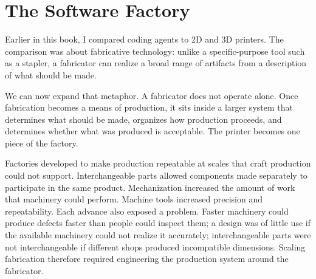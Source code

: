 


\chapter{The Software Factory}



Earlier in this book, I compared coding agents to 2D and 3D printers. The comparison was about fabricative technology: unlike a specific-purpose tool such as a stapler, a fabricator can realize a broad range of artifacts from a description of what should be made.


We can now expand that metaphor. A fabricator does not operate alone. Once fabrication becomes a means of production, it sits inside a larger system that determines what should be made, organizes how production proceeds, and determines whether what was produced is acceptable. The printer becomes one piece of the factory.


Factories developed to make production repeatable at scales that craft production could not support. Interchangeable parts allowed components made separately to participate in the same product. Mechanization increased the amount of work that machinery could perform. Machine tools increased precision and repeatability. Each advance also exposed a problem. Faster machinery could produce defects faster than people could inspect them; a design was of little use if the available machinery could not realize it accurately; interchangeable parts were not interchangeable if different shops produced incompatible dimensions. Scaling fabrication therefore required engineering the production system around the fabricator.

